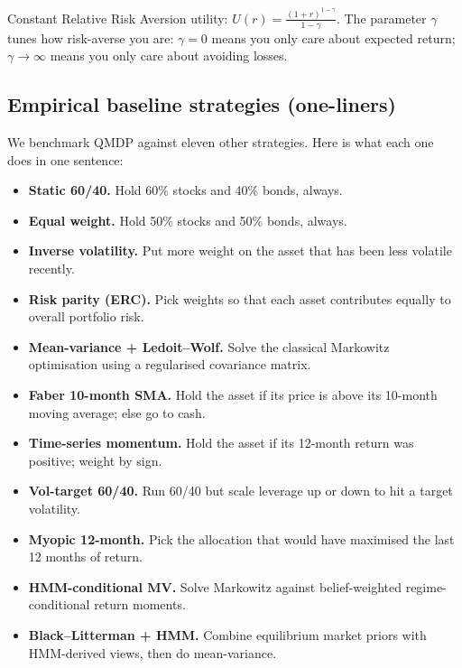 \documentclass[11pt]{article}
\begin{document}
\begin{definition}
Constant Relative Risk Aversion utility: $U(r) = \frac{(1+r)^{1-\gamma}}{1-\gamma}$. The parameter $\gamma$ tunes how risk-averse you are: $\gamma = 0$ means you only care about expected return; $\gamma \to \infty$ means you only care about avoiding losses.
\end{definition}

\subsection{Empirical baseline strategies (one-liners)}

We benchmark QMDP against eleven other strategies. Here is what each one does in one sentence:

\begin{itemize}
  \item \textbf{Static 60/40.} Hold 60\% stocks and 40\% bonds, always.
  \item \textbf{Equal weight.} Hold 50\% stocks and 50\% bonds, always.
  \item \textbf{Inverse volatility.} Put more weight on the asset that has been less volatile recently.
  \item \textbf{Risk parity (ERC).} Pick weights so that each asset contributes equally to overall portfolio risk.
  \item \textbf{Mean-variance + Ledoit--Wolf.} Solve the classical Markowitz optimisation using a regularised covariance matrix.
  \item \textbf{Faber 10-month SMA.} Hold the asset if its price is above its 10-month moving average; else go to cash.
  \item \textbf{Time-series momentum.} Hold the asset if its 12-month return was positive; weight by sign.
  \item \textbf{Vol-target 60/40.} Run 60/40 but scale leverage up or down to hit a target volatility.
  \item \textbf{Myopic 12-month.} Pick the allocation that would have maximised the last 12 months of return.
  \item \textbf{HMM-conditional MV.} Solve Markowitz against belief-weighted regime-conditional return moments.
  \item \textbf{Black--Litterman + HMM.} Combine equilibrium market priors with HMM-derived views, then do mean-variance.
\end{itemize}

\end{document}
